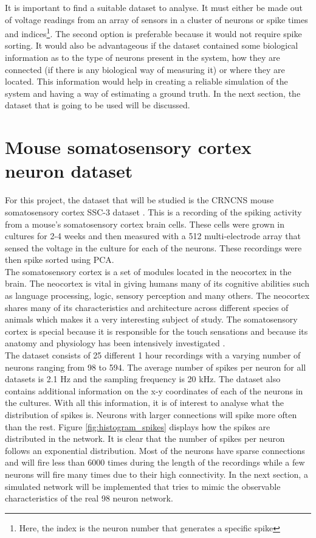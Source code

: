 It is important to find a suitable dataset to analyse. It must either be made out of voltage readings from an array of sensors in a cluster of neurons or spike times and indices\footnote{Here, the index is the neuron number that generates a specific spike}. The second option is preferable because it would not require spike sorting. It would also be advantageous if the dataset contained some biological information as to the type of neurons present in the system, how they are connected (if there is any biological way of measuring it) or where they are located. This information would help in creating a reliable simulation of the system and having a way of estimating a ground truth. In the next section, the dataset that is going to be used will be discussed. 

\section{Mouse somatosensory cortex neuron dataset}

For this project, the dataset that will be studied is the CRNCNS mouse somatosensory cortex SSC-3 dataset \cite{ito2016spontaneous, ito2014large, litke2004does}. This is a recording of the spiking activity from a mouse's somatosensory cortex brain cells. These cells were grown in cultures for 2-4 weeks and then measured with a 512 multi-electrode array that sensed the voltage in the culture for each of the neurons. These recordings were then spike sorted using PCA. \\

The somatosensory cortex is a set of modules located in the neocortex in the brain. The neocortex is vital in giving humans many of its cognitive abilities such as language processing, logic, sensory perception and many others. The neocortex shares many of its characteristics and architecture across different species of animals which makes it a very interesting subject of study. The somatosensory cortex is special because it is responsible for the touch sensations and because its anatomy and physiology has been intensively investigated \cite{markram2015reconstruction}.\\

The dataset consists of 25 different 1 hour recordings with a varying number of neurons ranging from 98 to 594. The average number of spikes per neuron for all datasets is 2.1 Hz and the sampling frequency is 20 kHz. The dataset also contains additional information on the x-y coordinates of each of the neurons in the cultures. With all this information, it is of interest to analyse what the distribution of spikes is. Neurons with larger connections will spike more often than the rest. Figure \ref{fig:histogram_spikes} displays how the spikes are distributed in the network. It is clear that the number of spikes per neuron follows an exponential distribution. Most of the neurons have sparse connections and will fire less than 6000 times during the length of the recordings while a few neurons will fire many times due to their high connectivity. In the next section, a simulated network will be implemented that tries to mimic the observable characteristics of the real 98 neuron network.\\

